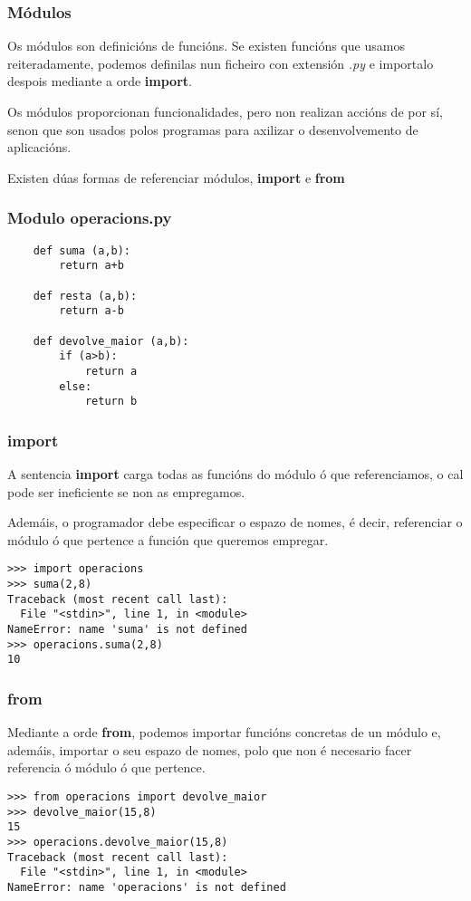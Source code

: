 \begin{frame}
  \frametitle{Módulos}
  Os módulos son definicións de funcións. Se existen funcións que usamos
  reiteradamente, podemos definilas nun ficheiro con extensión \emph{.py} e
  importalo despois mediante a orde \textbf{import}.

  Os módulos proporcionan funcionalidades, pero non realizan accións de por sí,
  senon que son usados polos programas para axilizar o desenvolvemento de
  aplicacións. 

  Existen dúas formas de referenciar módulos, \textbf{import} e \textbf{from}
\end{frame}

\begin{frame}[fragile]
  \frametitle{Modulo operacions.py}
  \small
  \begin{verbatim}
    def suma (a,b):
        return a+b
    
    def resta (a,b):
        return a-b

    def devolve_maior (a,b):
        if (a>b):
            return a
        else:
            return b
  \end{verbatim}
  \normalsize
\end{frame}

\begin{frame}[fragile]
  \frametitle{import}
  A sentencia \textbf{import} carga todas as funcións do módulo ó que
  referenciamos, o cal pode ser ineficiente se non as empregamos.

  Ademáis, o programador debe especificar o espazo de nomes, é decir,
  referenciar o módulo ó que pertence a función que queremos empregar.

  \small
  \begin{verbatim}
>>> import operacions
>>> suma(2,8)
Traceback (most recent call last):
  File "<stdin>", line 1, in <module>
NameError: name 'suma' is not defined
>>> operacions.suma(2,8)
10
  \end{verbatim}  
  \normalsize
\end{frame}

\begin{frame}[fragile]
  \frametitle{from}
  Mediante a orde \textbf{from}, podemos importar funcións concretas de un
  módulo e, ademáis, importar o seu espazo de nomes, polo que non é necesario
  facer referencia ó módulo ó que pertence.
  \small
  \begin{verbatim}
>>> from operacions import devolve_maior
>>> devolve_maior(15,8)
15
>>> operacions.devolve_maior(15,8)
Traceback (most recent call last):
  File "<stdin>", line 1, in <module>
NameError: name 'operacions' is not defined
  \end{verbatim}
  \normalsize
\end{frame}

